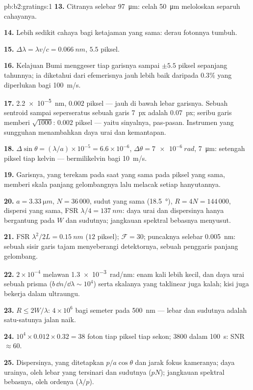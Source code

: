 \begin{solution}{pb:b2:gratings:1}
\textbf{13.} Citranya selebar \qty{97}{\micro m}: celah \qty{50}{\micro m} meloloskan
separuh cahayanya.

\textbf{14.} Lebih sedikit cahaya bagi ketajaman yang sama: derau fotonnya tumbuh.

\textbf{15.} $\Delta\lambda = \lambda v/c = \qty{0.066}{nm}$, $5.5$ piksel.

\textbf{16.} Kelajuan Bumi menggeser tiap garisnya sampai $\pm5.5$
piksel sepanjang tahunnya; ia diketahui dari efemerisnya jauh
lebih baik daripada $0.3\%$ yang diperlukan bagi \qty{100}{m/s}.

\textbf{17.} \qty{2.2e-5}{nm}, $0.002$ piksel --- jauh di bawah lebar garisnya. Sebuah
sentroid sampai seperseratus sebuah garis \qty{7}{px} adalah \qty{0.07}{px}; seribu
garis memberi $\sqrt{1000}$: $0.002$ piksel --- yaitu sinyalnya, pas-pasan. Instrumen
yang sungguhan menambahkan daya urai dan kemantapan.

\textbf{18.} $\Delta\sin\theta = (\lambda/a) \times 10^{-5} = 6.6 \times 10^{-6}$, $\Delta\theta = \qty{7e-6}{rad}$,
\qty{7}{\micro m}: setengah piksel tiap kelvin --- bermilikelvin bagi \qty{10}{m/s}.

\textbf{19.} Garisnya, yang terekam pada saat yang sama pada piksel yang sama,
memberi skala panjang gelombangnya lalu melacak setiap hanyutannya.

\textbf{20.} $a = \qty{3.33}{\micro m}$, $N = 36\,000$, sudut yang sama (\qty{18.5}{\degree}), $R = 4N
= 144\,000$, dispersi yang sama, FSR $\lambda/4 = \qty{137}{nm}$: daya urai dan
dispersinya hanya bergantung pada $W$ dan sudutnya; jangkauan spektral bebasnya
menyusut.

\textbf{21.} FSR $\lambda^2/2L = \qty{0.15}{nm}$ ($12$ piksel); $\mathcal F = 30$; puncaknya
selebar \qty{0.005}{nm}: sebuah sisir garis tajam menyeberangi detektornya, sebuah
penggaris panjang gelombang.

\textbf{22.} $2 \times 10^{-4}$ melawan \qty{1.3e-3}{rad/nm}: enam kali lebih kecil, dan
daya urai sebuah prisma ($b\,\dd n/\dd\lambda \sim 10^4$) serta skalanya yang taklinear
juga kalah; kisi juga bekerja dalam ultraungu.

\textbf{23.} $R \le 2W/\lambda$: $4 \times 10^6$ bagi semeter pada \qty{500}{nm} --- lebar dan
sudutnya adalah satu-satunya jalan naik.

\textbf{24.} $10^4 \times 0.012 \times 0.32 = 38$ foton tiap piksel tiap sekon; $3800$
dalam \qty{100}{s}: SNR $\approx 60$.

\textbf{25.} Dispersinya, yang ditetapkan $p/a\cos\theta$ dan jarak fokus kameranya;
daya urainya, oleh lebar yang tersinari dan sudutnya ($pN$);
jangkauan spektral bebasnya, oleh ordenya ($\lambda/p$).
\end{solution}
